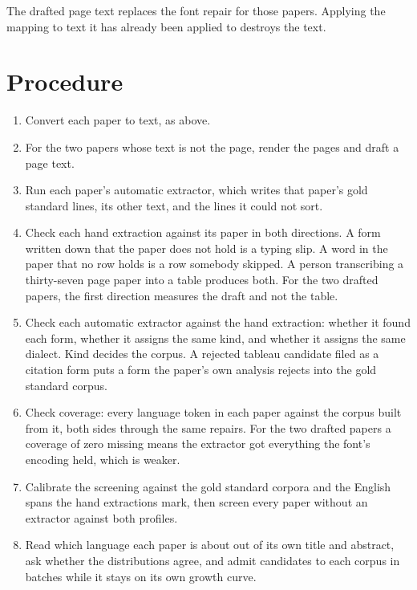 The drafted page text replaces the font repair for those papers. Applying the mapping to text it has
already been applied to destroys the text.

\section{Procedure}

\begin{enumerate}
  \item Convert each paper to text, as above.
  \item For the two papers whose text is not the page, render the pages and draft a page text.
  \item Run each paper's automatic extractor, which writes that paper's gold standard lines, its
        other text, and the lines it could not sort.
  \item Check each hand extraction against its paper in both directions. A form written down that
        the paper does not hold is a typing slip. A word in the paper that no row holds is a row
        somebody skipped. A person transcribing a thirty-seven page paper into a table produces
        both. For the two drafted papers, the first direction measures the draft and not the table.
  \item Check each automatic extractor against the hand extraction: whether it found each form,
        whether it assigns the same kind, and whether it assigns the same dialect. Kind decides the
        corpus. A rejected tableau candidate filed as a citation form puts a form the paper's own
        analysis rejects into the gold standard corpus.
  \item Check coverage: every language token in each paper against the corpus built from it, both
        sides through the same repairs. For the two drafted papers a coverage of zero missing means
        the extractor got everything the font's encoding held, which is weaker.
  \item Calibrate the screening against the gold standard corpora and the English spans the hand
        extractions mark, then screen every paper without an extractor against both profiles.
  \item Read which language each paper is about out of its own title and abstract, ask whether the
        distributions agree, and admit candidates to each corpus in batches while it stays on its
        own growth curve.
\end{enumerate}

